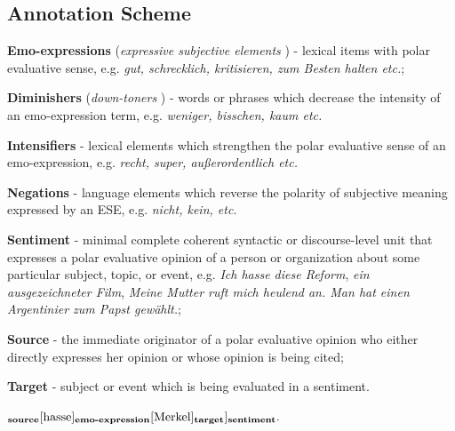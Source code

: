 \documentclass{beamer}
\begin{document}
\subsection{Annotation Scheme}
\begin{frame}{}
  \textbf{Emo-expressions} (\textit{expressive subjective elements}
  \cite{Wiebe-05}) - lexical items with polar evaluative sense,
  e.g. \textit{gut, schrecklich, kritisieren, zum Besten halten etc.};

  \textbf{Diminishers} (\textit{down-toners} \cite{Taboada-11}) - words or
  phrases which decrease the intensity of an emo-expression term,
  e.g. \textit{weniger, bisschen, kaum etc.}

  \textbf{Intensifiers} - lexical elements which strengthen the
  polar evaluative sense of an emo-expression, e.g. \textit{recht,
    super, au\ss{}erordentlich etc.}

  \textbf{Negations} - language elements which reverse the
  polarity of subjective meaning expressed by an ESE,
  e.g. \textit{nicht, kein, etc.}
\end{frame}

\begin{frame}{}
  \textbf{Sentiment} - minimal complete coherent syntactic or
  discourse-level unit that expresses a polar evaluative opinion
  of a person or organization about some particular subject,
  topic, or event, e.g. \textit{Ich hasse diese Reform},
  \textit{ein ausgezeichneter Film}, \textit{Meine Mutter ruft
    mich heulend an.  Man hat einen Argentinier zum Papst
    gew\"ahlt.};

  \textbf{Source} - the immediate originator of a polar evaluative
  opinion who either directly expresses her opinion or whose
  opinion is being cited;

  \textbf{Target} - subject or event which is being evaluated in a
  sentiment.
\end{frame}

\begin{frame}{}
  \begin{example}
    \begin{math}
      [[\text{Ich}]_{\text{\bfseries source}}
        [\text{hasse}]_{\text{\bfseries emo-expression}}
        [\text{Merkel}]_{\text{\bfseries target}}]_{\text{\bfseries sentiment}}\text{.}
    \end{math}
  \end{example}
\end{frame}
\end{document}
